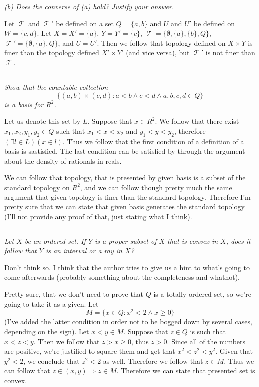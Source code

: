 \documentclass[11pt,oneside,titlepage]{book}
\DeclareMathOperator \topol {\mathcal {T}}
\DeclareMathOperator \ra {\Rightarrow}
\newcommand{\set}[1]{\{ #1 \}}
\begin{document}
\textit{(b) Does the converse of (a) hold? Justify your answer.}

Let $\topol$ and $\topol'$ be defined on a set $Q = \set{a, b}$ and
$U$ and $U'$ be defined on $W = \set{c, d}$.
Let $X = X' = \set{a}$, $Y = Y' = \set{c}$, $\topol = \set{\emptyset, \set{a}, \set{b}, Q}$,
$\topol' = \set{\emptyset, \set{a}, Q}$, and $U = U'$. Then we follow that
topology defined on $X \times Y$ is finer than the topology defined $X' \times Y'$ (and vice versa),
but $\topol'$ is not finer than $\topol$.



\subsection{}

\textit{Show that the countable collection
  $$\set{(a, b) \times (c, d): a < b \land c < d \land a, b, c, d \in Q}$$
  is a basis for $R^2$.}

Let us denote this set by $L$.
Suppose that $x \in R^2$. We follow that there exist $x_1, x_2, y_1, y_2 \in Q$ such that
$x_1 < x < x_2$ and $y_1 < y < y_2$, therefore $(\exists l \in L)(x \in l)$. Thus we follow that
the first condition of a definition of a basis is sastisfied. The last condition can be satisfied
by through the argument about the density of rationals in reals.


We can follow that topology, that is presented by given basis is a subset of the standard topology
on $R^2$, and we can follow though pretty much the same argument that given topology is
finer than the standard topology. Therefore I'm pretty sure that we can state that given basis
generates the standard topology (I'll not provide any proof of that, just stating what I think).


\subsection{}

\textit{Let $X$ be an ordered set. If $Y$ is a proper subset of $X$ that is
  convex in $X$, does it follow that $Y$ is an interval or a ray in $X$?}

Don't think so. I think that the author tries to give us a hint to what's going to come afterwards
(probably something about the completeness and whatnot).

Pretty sure, that we don't need to prove that $Q$ is a totally ordered set, so we're going to
take it as a given. Let
$$M = \set{x \in Q: x^2 < 2 \land x \geq 0}$$
(I've added the latter condition in order not to be bogged down  by
several cases, depending on the sign).
Let $x < y \in M$. Suppose that $z \in Q$ is such that  $x < z < y$. Then
we follow that $z > x  \geq  0$, thus $z > 0$. Since all of the numbers are positive,
we're justified to square them and get that
$x^2 < z^2 < y^2$. Given that $y^2 < 2$, we conclude that $z^2 < 2$ as well. Therefore
we follow that $z \in M$. Thus we can follow that $z \in (x, y) \ra z \in M$. Therefore
we can state that presented set is convex.
\end{document}
